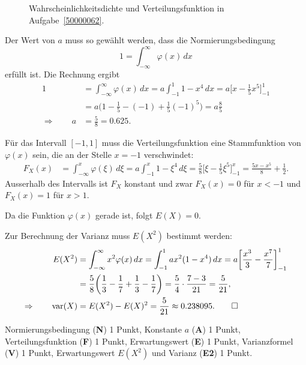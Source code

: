 \begin{loesung}
\begin{figure}
\caption{Wahrscheinlichkeitsdichte und Verteilungsfunktion in 
Aufgabe~\ref{50000062}.
\label{50000062:fig}}
\end{figure}
\begin{teilaufgaben}
\item
Der Wert von $a$ muss so gewählt werden, dass die Normierungsbedingung
\[
1
=
\int_{-\infty}^\infty \varphi(x)\,dx
\]
erfüllt ist.
Die Rechnung ergibt
\begin{align*}
1
&=
\int_{-\infty}^\infty \varphi(x) \,dx
=
a
\int_{-1}^{1} 1-x^4 \,dx
=
a
\biggl[
x-\frac15x^5
\biggr]_{-1}^{1}
\\
&=
a\biggl(
1-\frac15-(-1)+\frac15(-1)^5
\biggr)
=
a\frac{8}{5}
\\
\Rightarrow
\qquad
a
&=
\frac{5}{8} = 0.625.
\end{align*}
\item
Für das Intervall $[-1,1]$ muss die Verteilungsfunktion eine Stammfunktion
von $\varphi(x)$ sein, die an der Stelle $x=-1$ verschwindet:
\begin{align*}
F_X(x)
&=
\int_{-\infty}^x \varphi(\xi)\,d\xi
=
a
\int_{-1}^x 1-\xi^4\,d\xi
=
\frac{5}{8}
\biggl[
\xi-\frac15\xi^5
\biggr]_{-1}^x
=
\frac{5x-x^5}{8} + \frac{1}{2}.
\end{align*}
Ausserhalb des Intervalls ist $F_X$ konstant und zwar $F_X(x)=0$ für $x<-1$
und $F_X(x) = 1$ für $x > 1$.
\item
Da die Funktion $\varphi(x)$ gerade ist, folgt $E(X)=0$.
\item
Zur Berechnung der Varianz muss $E(X^2)$ bestimmt werden:
\begin{align*}
E(X^2)
&=
\int_{-\infty}^\infty x^2\varphi(x)\,dx
=
\int_{-1}^{1} ax^2(1-x^4)\,dx
=
a\biggl[
\frac{x^3}{3}
-
\frac{x^7}{7}
\biggr]_{-1}^1
\\
&=
\frac58
\biggl(
\frac13-\frac17+\frac13-\frac17
\biggr)
=
\frac54\cdot \frac{7-3}{21}
=
\frac{5}{21},
\\
\Rightarrow\qquad
\operatorname{var}(X)
&=
E(X^2) - E(X)^2
=
\frac{5}{21}
\approx
0.238095.
\qedhere
\end{align*}
\end{teilaufgaben}
\end{loesung}

\begin{bewertung}
Normierungsbedingung ({\bf N}) 1 Punkt,
Konstante $a$ ({\bf A}) 1 Punkt,
Verteilungsfunktion ({\bf F}) 1 Punkt,
Erwartungswert ({\bf E}) 1 Punkt,
Varianzformel ({\bf V}) 1 Punkt,
Erwartungswert $E(X^2)$ und Varianz ({\bf E2}) 1 Punkt.
\end{bewertung}
